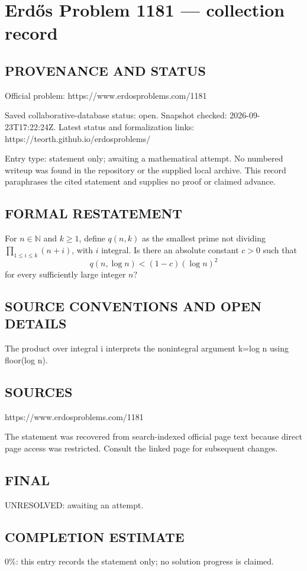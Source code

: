 \section*{Erd\H{o}s Problem 1181 --- collection record}

\subsection*{PROVENANCE AND STATUS}
Official problem: https://www.erdosproblems.com/1181

Saved collaborative-database status: open.
Snapshot checked: 2026-09-23T17:22:24Z.
Latest status and formalization links: https://teorth.github.io/erdosproblems/

Entry type: statement only; awaiting a mathematical attempt. No numbered writeup was found in the repository or the supplied local archive. This record paraphrases the cited statement and supplies no proof or claimed advance.

\subsection*{FORMAL RESTATEMENT}
For $n\in\mathbb N$ and $k\geq1$, define $q(n,k)$ as the smallest prime not dividing $\prod_{1\leq i\leq k}(n+i)$, with $i$ integral. Is there an absolute constant $c>0$ such that
\[q(n,\log n)<(1-c)(\log n)^2\]
for every sufficiently large integer $n$?

\subsection*{SOURCE CONVENTIONS AND OPEN DETAILS}
The product over integral i interprets the nonintegral argument k=log n using floor(log n).

\subsection*{SOURCES}
https://www.erdosproblems.com/1181

The statement was recovered from search-indexed official page text because direct page access was restricted. Consult the linked page for subsequent changes.

\subsection*{FINAL}
UNRESOLVED: awaiting an attempt.

\subsection*{COMPLETION ESTIMATE}
$0\%$: this entry records the statement only; no solution progress is claimed.

